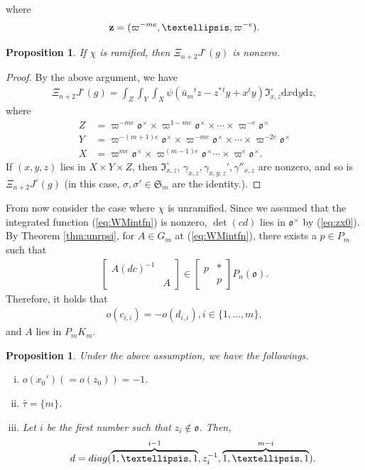\documentclass[11pt]{amsart}
\newcommand\s{\sigma}%
\newcommand\Vp{\varpi}%
\newcommand\vp{\varphi}%
\newcommand\oo{\mathfrak{o}}
\newcommand\Sf{{\mathfrak{S}}}
\newcommand\If{\mathfrak{I}}
\newcommand\dr{\mathrm{d}}
\newcommand\zb{{\bold{z}}}
\newcommand\1{\mathbf{1}}
\newcommand\diag{{\rm diag}}
\newcommand\tm{\times}
\newcommand\bu{\bar{u}}
\numberwithin{equation}{section}
\newtheorem{prop}[thm]{Proposition}
\begin{document}
where 
\begin{align*}
\zb = (\Vp^{-me}, \ldots, \Vp^{-e}).
\end{align*} 
\begin{prop}
If $\chi$ is ramified, then $\Xi_{n+2}J^\circ(g)$ is nonzero.
\end{prop}
\begin{proof}
By the above argument, we have 
\begin{align*}
\Xi_{n+2}J^\circ(g) = \int_{Z} \int_Y \int_X \psi(\bu_m{}^tz-z^*{}^ty+ x{}^ty)\If_{x,z}^\circ \dr x \dr y \dr z,
\end{align*} 
where
\begin{align*}
Z &= \Vp^{-me} \oo^\tm \tm \Vp^{1-me} \oo^\tm \tm \cdots \tm \Vp^{-e} \oo^\tm\\
Y &= \Vp^{-(m+1)e} \oo^\tm \tm \Vp^{-me} \oo^\tm \tm \cdots \tm \Vp^{-2e} \oo^\tm\\
X &= \Vp^{me} \oo^\tm \tm \Vp^{(m-1)e} \oo^\tm  \cdots \tm \Vp^{e} \oo^\tm.
\end{align*} 
If $(x,y,z)$ lies in $X \tm Y \tm Z$, then $\If_{x,z}^\circ$, $\gamma_{x,z}, \gamma_{x,y,z}', \gamma''_{x,z}$ are nonzero, and so is $\Xi_{n+2}J^\circ(g)$ (in this case, $\s, \s' \in \Sf_m$ are the identity.).
\end{proof}
From now consider the case where $\chi$ is unramified.
Since we assumed that the integrated function (\ref{eq:WMintfn}) is nonzero, $\det(cd)$ lies in $\oo^\tm$ by (\ref{eq:zx0}).
By Theorem \ref{thm:unrpsi}, for $A \in G_m$ at (\ref{eq:WMintfn}), there exists a $p \in P_m$ such that 
\begin{align*}
\begin{bmatrix}
A (dc)^{-1} &  \\
& A
\end{bmatrix} \in \begin{bmatrix}
p & *  \\
& p
\end{bmatrix} P_{n}(\oo).
\end{align*} 
Therefore, it holds that
\begin{align}
o(c_{i,i}) = -o(d_{i,i}), i \in \{1,\ldots, m\}, \label{eq:ocod}
\end{align}
and $A$ lies in $P_mK_m$.  
\begin{prop}\label{prop:zd}
Under the above assumption, we have the followings.
\begin{enumerate}[i)]
\item $o(x_0') (=o(z_0)) = -1$. 
\item $\bar{\tau} = \{m \}$.
\item Let $i$ be the first number such that $z_i \not\in \oo$.
Then,
\begin{align*}
d = \diag(\overbrace{1, \ldots, 1}^{i-1}, z_i^{-1}, \overbrace{1, \ldots, 1}^{m-i}).
\end{align*} 
\end{enumerate}
\end{prop}
\end{document}

